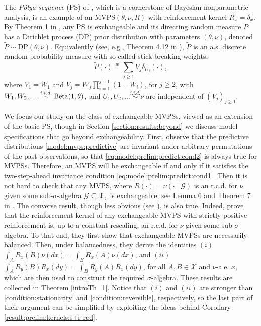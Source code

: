 \documentclass[a4paper]{article}
\theoremstyle{plain}
\theoremstyle{remark}
\theoremstyle{definition}
\newcommand{\Polya}{P\'{o}lya }
\begin{document}
The \textit{\Polya sequence} (PS) of \cite{blackwell1973ferguson}, which is a cornerstone of Bayesian nonparametric analysis, is an example of an MVPS$(\theta,\nu,R)$ with reinforcement kernel $R_x=\delta_x$. By Theorem 1 in \cite{blackwell1973ferguson}, any PS is exchangeable and its directing random measure $\tilde{P}$ has a Dirichlet process (DP) prior distribution with parameters $(\theta,\nu)$, denoted $\tilde{P}\sim\mathrm{DP}(\theta,\nu)$. Equivalently (see, e.g., Theorem 4.12 in \cite{ghosal2017}), $\tilde{P}$ is an a.s. discrete random probability measure with so-called stick-breaking weights,
\begin{equation}\label{Sethuraman}
\tilde{P}(\cdot)\overset{w}{=}\sum_{j\geq1} V_j\delta_{U_j}(\cdot),
\end{equation}
where $V_1=W_1$ and $V_j=W_j\prod_{i=1}^{j-1}(1-W_i)$, for $j\geq2$, with $W_1,W_2,\ldots\overset{i.i.d.}{\sim}\textnormal{Beta}(1,\theta)$, and $U_1,U_2,\ldots\overset{i.i.d.}{\sim}\nu$ are independent of $(V_j)_{j\geq1}$.

We focus our study on the class of exchangeable MVPSs, viewed as an extension of the basic PS, though in Section \ref{section:results:beyond} we discuss model specifications that go beyond exchangeability. First, observe that the predictive distributions \eqref{model:mvps:predictive} are invariant under arbitrary permutations of the past observations, so that \eqref{eq:model:prelim:predict:cond2} is always true for MVPSs. Therefore, an MVPS will be exchangeable if and only if it satisfies the two-step-ahead invariance condition \eqref{eq:model:prelim:predict:cond1}. Then it is not hard to check that any MVPS, where $R(\cdot)=\nu(\cdot\mid\mathcal{G})$ is an r.c.d. for $\nu$ given some sub-$\sigma$-algebra $\mathcal{G}\subseteq\mathcal{X},$ is exchangeable; see Lemma 6 and Theorem 7 in \cite{berti2023kernel}. The converse result, though less obvious (see \citet[p.\,11,\,18]{berti2023kernel}), is also true. Indeed, \cite{sariev2024} prove that the reinforcement kernel of any exchangeable MVPS with strictly positive reinforcement is, up to a constant rescaling, an r.c.d. for $\nu$ given some sub-$\sigma$-algebra. To that end, they first show that exchangeable MVPSs are necessarily balanced. Then, under balancedness, they derive the identities $(i)$ $\int_AR_x(B)\nu(dx)=\int_BR_x(A)\nu(dx)$, and $(ii)$ $\int_AR_y(B)R_x(dy)=\int_BR_y(A)R_x(dy)$, for all $A,B\in\mathcal{X}$ and $\nu$-a.e. $x$, which are then used to construct the required $\sigma$-algebra. These results are collected in Theorem \ref{introTh_1}. Notice that $(i)$ and $(ii)$ are stronger than \eqref{condition:stationarity} and \eqref{condition:reversible}, respectively, so the last part of their argument can be simplified by exploiting the ideas behind Corollary \ref{result:prelim:kernels:s+r-rcd}.
\end{document}
